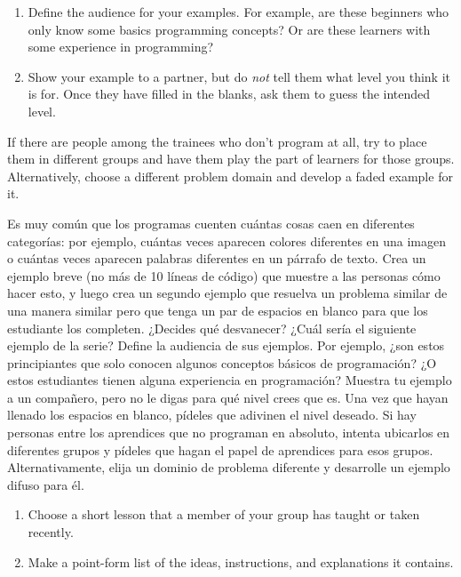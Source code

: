 {\begin{enumerate}
\item
  Define the audience for your examples.
  For example,
  are these beginners who only know some basics programming concepts?
  Or are these learners with some experience in programming?

\item
  Show your example to a partner,
  but do \emph{not} tell them what level you think it is for.
  Once they have filled in the blanks,
  ask them to guess the intended level.

\end{enumerate}

If there are people among the trainees who don't program at all,
try to place them in different groups
and have them play the part of learners for those groups.
Alternatively,
choose a different problem domain and develop a faded example for it.

Es muy común que los programas cuenten cuántas cosas caen en diferentes categorías: por ejemplo, cuántas veces aparecen colores diferentes en una imagen o cuántas veces aparecen palabras diferentes en un párrafo de texto.
Crea un ejemplo breve (no más de 10 líneas de código) que muestre a las personas cómo hacer esto, y luego crea un segundo ejemplo que resuelva un problema similar de una manera similar pero que tenga un par de espacios en blanco para que los estudiante los completen. ¿Decides qué desvanecer? ¿Cuál sería el siguiente ejemplo de la serie?
Define la audiencia de sus ejemplos. Por ejemplo, ¿son estos principiantes que solo conocen algunos conceptos básicos de programación? ¿O estos estudiantes tienen alguna experiencia en programación?
Muestra tu ejemplo a un compañero, pero no le digas para qué nivel crees que es. Una vez que hayan llenado los espacios en blanco, pídeles que adivinen el nivel deseado.
Si hay personas entre los aprendices que no programan en absoluto, intenta ubicarlos en diferentes grupos y pídeles que hagan el papel de aprendices para esos grupos. Alternativamente, elija un dominio de problema diferente y desarrolle un ejemplo difuso para él.



\begin{enumerate}

\item
  Choose a short lesson that a member of your group has taught or taken recently.

\item
  Make a point-form list of the ideas, instructions, and explanations it contains.


\end{enumerate}}
